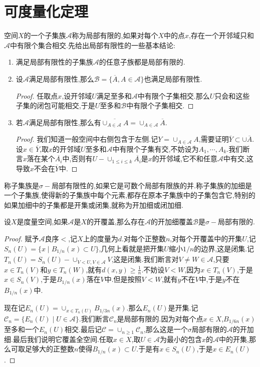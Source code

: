 \section{可度量化定理}

空间$X$的一个子集族$\mathscr{A}$称为局部有限的,如果对每个$X$中的点$x$,存在一个开邻域只和$\mathscr{A}$中有限个集合相交.先给出局部有限性的一些基本结论:
\begin{enumerate}
	\item 满足局部有限性的子集族$\mathscr{A}$的任意子族都是局部有限的.
	\item 设$\mathscr{A}$满足局部有限性,那么$\mathscr{B}=\{\overline{A},A\in\mathscr{A}\}$也满足局部有限性.
	\begin{proof}
		
		任取点$x$,设开邻域$U$满足至多和$\mathscr{A}$中有限个子集相交.那么$U$只会和这些子集的闭包可能相交,于是$U$至多和$\mathscr{B}$中有限个子集相交.
	\end{proof}
	\item 若$\mathscr{A}$满足局部有限性,那么有$\overline{\cup_{A\in\mathscr{A}}A}=\cup_{A\in\mathscr{A}}\overline{A}$.
	\begin{proof}
		
		我们知道一般空间中右侧包含于左侧.记$Y=\cup_{A\in\mathscr{A}}A$,需要证明$\overline{Y}\subset\cup\overline{A}$.设$x\in\overline{Y}$,取$x$的开邻域$U$至多和$\mathscr{A}$中有限个子集有交,不妨设为$A_1,\cdots,A_k$.我们断言$x$落在某个$\overline{A_i}$中,否则有$U-\cup_{1\le i\le k}\overline{A_i}$是$x$的开邻域,它不和任意$\mathscr{A}$中有交,这导致$x$不会在$\overline{Y}$中.
	\end{proof}
\end{enumerate}

称子集族是$\sigma-$局部有限性的,如果它是可数个局部有限族的并.称子集族的加细是一个子集族,使得新的子集族中每个元素,都存在原本子集族中的子集包含它,特别的如果加细中的子集都是开集或闭集,就称为开加细或闭加细.

设$X$是度量空间,如果$\mathscr{A}$是$X$的开覆盖,那么存在$\mathscr{A}$的开加细覆盖$\mathscr{B}$是$\sigma-$局部有限的.
\begin{proof}
	
	赋予$\mathscr{A}$良序$<$,记$X$上的度量为$d$.对每个正整数$n$,对每个开覆盖中的开集$U$,记$S_n(U)=\{x\mid B_{1/n}(x)\subset U\}$,几何上看就是把开集$U$缩小$1/n$的边界,这是闭集.记$T_n(U)=S_n(U)-\cup_{V<U,V\in\mathscr{A}}V$,这是闭集.我们断言对$V\not=W\in\mathscr{A}$,只要$x\in T_n(V)$和$y\in T_n(W)$,就有$d(x,y)\ge\frac{1}{n}$.不妨设$V<W$,因为$x\in T_n(V)$,于是$x\in S_n(V)$,于是$B_{1/n}(x)$落在$V$中.但是按照$V<W$,就有$y$不在$V$中,于是$y$不在$B_{1/n}(x)$中.
	
	现在记$E_n(U)=\cup_{x\in T_n(U)}B_{1/3n}(x)$.那么$E_n(U)$是开集.记$\mathscr{C}_n=\{E_n(U)\mid U\in\mathscr{A}\}$.我们断言$\mathscr{C}_n$是局部有限的.因为对每个点$x\in X$,$B_{1/6n}(x)$至多和一个$E_n(U)$相交.最后记$\mathscr{C}=\cup_{n\ge1}\mathscr{C}_n$,那么这是一个$\sigma$局部有限的$\mathscr{A}$的开加细.最后我们说明它覆盖全空间.任取$x\in X$,取$U\in\mathscr{A}$为最小的包含$x$的$\mathscr{A}$中的开集,那么可取足够大的正整数$n$使得$B_{1/n}(x)\subset U$.于是有$x\in S_n(U)$,于是$x\in E_n(U)$.
\end{proof}

